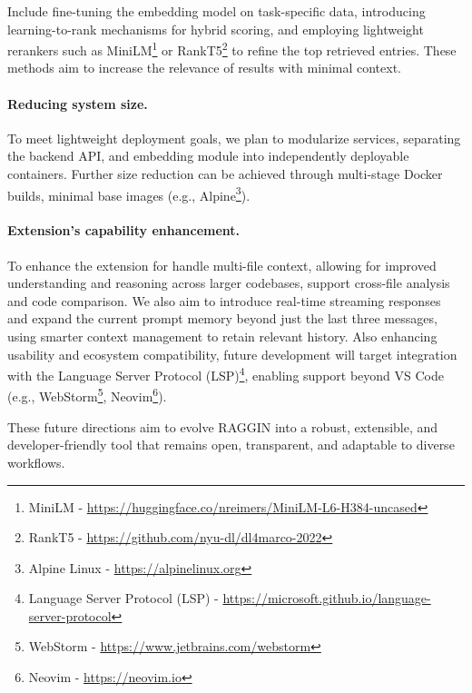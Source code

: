 Include fine-tuning the embedding model on task-specific data, introducing learning-to-rank mechanisms for hybrid scoring, and employing lightweight rerankers such as MiniLM\footnote{MiniLM - \url{https://huggingface.co/nreimers/MiniLM-L6-H384-uncased}} or RankT5\footnote{RankT5 - \url{https://github.com/nyu-dl/dl4marco-2022}} to refine the top retrieved entries. These methods aim to increase the relevance of results with minimal context.

\paragraph*{Reducing system size.}

To meet lightweight deployment goals, we plan to modularize services, separating the backend API, and embedding module into independently deployable containers. Further size reduction can be achieved through multi-stage Docker builds, minimal base images (e.g., Alpine\footnote{Alpine Linux - \url{https://alpinelinux.org}}).

\paragraph*{Extension's capability enhancement.}

To enhance the extension for handle multi-file context, allowing for improved understanding and reasoning across larger codebases, support cross-file analysis and code comparison. We also aim to introduce real-time streaming responses and expand the current prompt memory beyond just the last three messages, using smarter context management to retain relevant history. Also enhancing usability and ecosystem compatibility, future development will target integration with the Language Server Protocol (LSP)\footnote{Language Server Protocol (LSP) - \url{https://microsoft.github.io/language-server-protocol}}, enabling support beyond VS Code (e.g., WebStorm\footnote{WebStorm - \url{https://www.jetbrains.com/webstorm}}, Neovim\footnote{Neovim - \url{https://neovim.io}}).
 
These future directions aim to evolve RAGGIN into a robust, extensible, and developer-friendly tool that remains open, transparent, and adaptable to diverse workflows.

